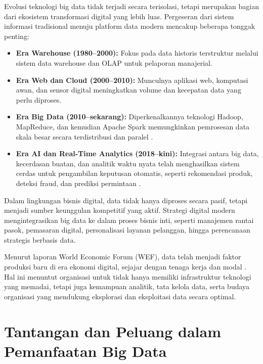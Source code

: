 Evolusi teknologi big data tidak terjadi secara terisolasi, tetapi merupakan bagian dari ekosistem transformasi digital yang lebih luas. Pergeseran dari sistem informasi tradisional menuju platform data modern mencakup beberapa tonggak penting:

\begin{itemize}
	\item \textbf{Era Warehouse (1980–2000):} Fokus pada data historis terstruktur melalui sistem data warehouse dan OLAP untuk pelaporan manajerial.
	
	\item \textbf{Era Web dan Cloud (2000–2010):} Munculnya aplikasi web, komputasi awan, dan sensor digital meningkatkan volume dan kecepatan data yang perlu diproses.
	
	\item \textbf{Era Big Data (2010–sekarang):} Diperkenalkannya teknologi Hadoop, MapReduce, dan kemudian Apache Spark memungkinkan pemrosesan data skala besar secara terdistribusi dan paralel \cite{assuncao2015, jagadish2014}.
	
	\item \textbf{Era AI dan Real-Time Analytics (2018–kini):} Integrasi antara big data, kecerdasan buatan, dan analitik waktu nyata telah menghasilkan sistem cerdas untuk pengambilan keputusan otomatis, seperti rekomendasi produk, deteksi fraud, dan prediksi permintaan \cite{davenport2018, fernandez2020}.
\end{itemize}

Dalam lingkungan bisnis digital, data tidak hanya diproses secara pasif, tetapi menjadi sumber keunggulan kompetitif yang aktif. Strategi digital modern mengintegrasikan big data ke dalam proses bisnis inti, seperti manajemen rantai pasok, pemasaran digital, personalisasi layanan pelanggan, hingga perencanaan strategis berbasis data.

Menurut laporan World Economic Forum (WEF), data telah menjadi faktor produksi baru di era ekonomi digital, sejajar dengan tenaga kerja dan modal \cite{wef2016}. Hal ini menuntut organisasi untuk tidak hanya memiliki infrastruktur teknologi yang memadai, tetapi juga kemampuan analitik, tata kelola data, serta budaya organisasi yang mendukung eksplorasi dan eksploitasi data secara optimal.



\section{Tantangan dan Peluang dalam Pemanfaatan Big Data}

